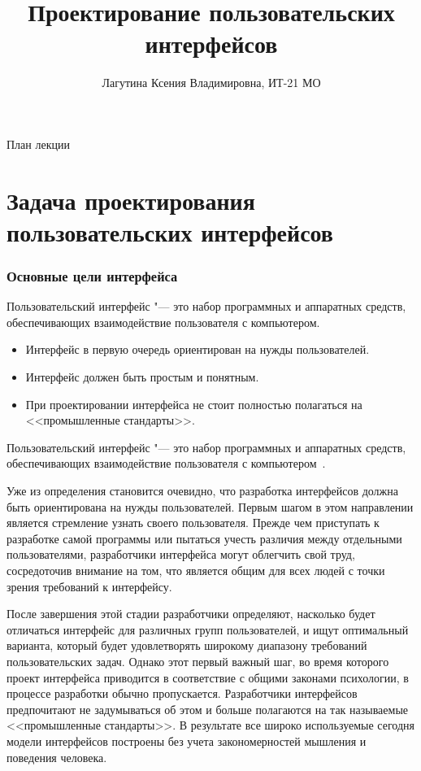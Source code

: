 \documentclass{../industrial-development}
\title{Проектирование пользовательских интерфейсов}
\author{Лагутина Ксения Владимировна, ИТ-21 МО}
\date{}
\begin{document}
\begin{frame}
  \titlepage
\end{frame}

\begin{frame}{План лекции}
  \tableofcontents
\end{frame}

\section{Задача проектирования пользовательских интерфейсов}

\begin{frame} \frametitle{Основные цели интерфейса}
  \begin{definition}
    \alert{Пользовательский интерфейс} "--- это набор программных и аппаратных средств, обеспечивающих взаимодействие пользователя с компьютером.
  \end{definition}
  
  \begin{itemize}
   \item Интерфейс в первую очередь ориентирован на нужды пользователей.
   \item Интерфейс должен быть простым и понятным.
   \item При проектировании интерфейса не стоит полностью полагаться на <<промышленные стандарты>>.
  \end{itemize}
\end{frame}

\lecturenotes

Пользовательский интерфейс "--- это набор программных и аппаратных средств, обеспечивающих взаимодействие пользователя с компьютером~\cite{Bauman}.

Уже из определения становится очевидно, что разработка интерфейсов должна быть ориентирована на нужды пользователей. Первым шагом в этом направлении является стремление узнать своего пользователя. Прежде чем приступать к разработке самой программы или пытаться учесть различия между отдельными пользователями, разработчики интерфейса могут облегчить свой труд, сосредоточив внимание на том, что является общим для всех людей с точки зрения требований к интерфейсу.

После завершения этой стадии разработчики определяют, насколько будет отличаться интерфейс для различных групп пользователей, и ищут оптимальный варианта, который будет удовлетворять широкому диапазону требований пользовательских задач. Однако этот первый важный шаг, во время которого проект интерфейса приводится в соответствие с общими законами психологии, в процессе разработки обычно пропускается. Разработчики интерфейсов предпочитают не задумываться об этом и больше полагаются на так называемые <<промышленные стандарты>>. В результате все широко используемые сегодня модели интерфейсов построены без учета закономерностей мышления и поведения человека.
\end{document}

